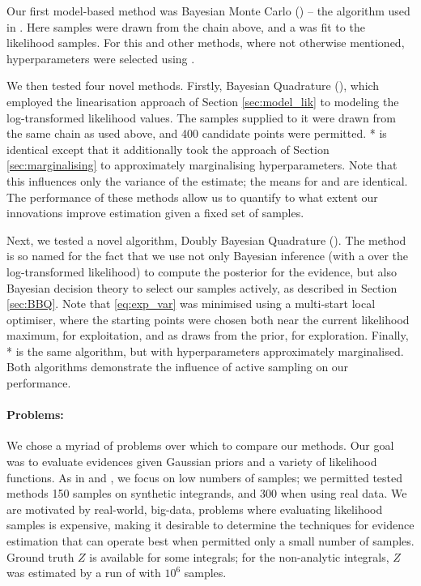 \documentclass{article} %
\begin{document}
Our first model-based method was Bayesian Monte Carlo () -- the algorithm used in \cite{BZMonteCarlo}. Here samples were drawn from the  chain above, and a \gpb was fit to the likelihood samples. For this and other methods, where not otherwise mentioned, \gpb hyperparameters were selected using . 

We then tested four novel methods. Firstly, Bayesian Quadrature (), which employed the linearisation approach of Section \ref{sec:model_lik} to modeling the log-transformed likelihood values. The samples supplied to it were drawn from the same  chain as used above, and 400 candidate points were permitted. * is identical except that it additionally took the approach of Section \ref{sec:marginalising} to approximately marginalising hyperparameters. Note that this influences only the variance of the estimate; the means for  and  are identical. The performance of these methods allow us to quantify to what extent our innovations improve estimation given a fixed set of samples. 

Next, we tested a novel algorithm, Doubly Bayesian Quadrature (). The method is so named for the fact that we use not only Bayesian inference (with a \gpb over the log-transformed likelihood) to compute the posterior for the evidence, but also Bayesian decision theory to select our samples actively, as described in Section \ref{sec:BBQ}. Note that \eqref{eq:exp_var} was minimised using a multi-start local optimiser, where the starting points were chosen both near the current likelihood maximum, for exploitation, and as draws from the prior, for exploration. Finally, * is the same algorithm, but with hyperparameters approximately marginalised. Both algorithms demonstrate the influence of active sampling on our performance. 

\paragraph{Problems:}
We chose a myriad of problems over which to compare our methods. Our goal was to evaluate evidences given Gaussian priors and a variety of likelihood functions. As in \cite{BZMonteCarlo} and \cite{BQR}, we focus on low numbers of samples; we permitted tested methods 150 samples on synthetic integrands, and 300 when using real data. We are motivated by real-world, big-data, problems where evaluating likelihood samples is expensive, making it desirable to determine the techniques for evidence estimation that can operate best when permitted only a small number of samples. Ground truth $Z$ is available for some integrals; for the non-analytic integrals, $Z$ was estimated by a run of  with $10^6$ samples.
\end{document}
